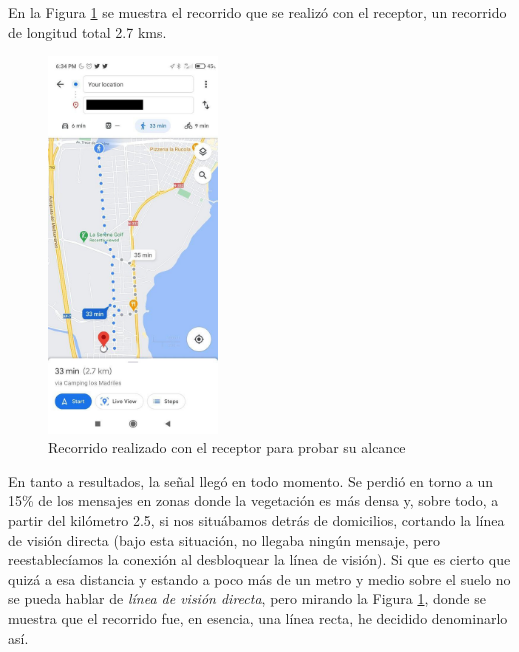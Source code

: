 \documentclass[12pt]{article}
\begin{document}
	\pagebreak
	
	\noindent En la Figura \ref{prueba 1 captura alcance} se muestra el recorrido que se realizó con el receptor, un recorrido de longitud total 2.7 kms. 
	
	
	\begin{figure}[h!]
		\begin{center}
			\includegraphics[width=0.4\textwidth]{img/prueba_1.jpg}
			\caption{Recorrido realizado con el receptor para probar su alcance}
			\label{prueba 1 captura alcance}
		\end{center}
	\end{figure}
	
	
	\noindent En tanto a resultados, la señal llegó en todo momento. Se perdió en torno a un 15\% de los mensajes en zonas donde la vegetación es más densa y, sobre todo, a partir del kilómetro 2.5, si nos situábamos detrás de domicilios, cortando la línea de visión directa (bajo esta situación, no llegaba ningún mensaje, pero reestablecíamos la conexión al desbloquear la línea de visión). Si que es cierto que quizá a esa distancia y estando a poco más de un metro y medio sobre el suelo no se pueda hablar de \textit{línea de visión directa}, pero mirando la Figura \ref{prueba 1 captura alcance}, donde se muestra que el recorrido fue, en esencia, una línea recta, he decidido denominarlo así.\\
	
\end{document}
